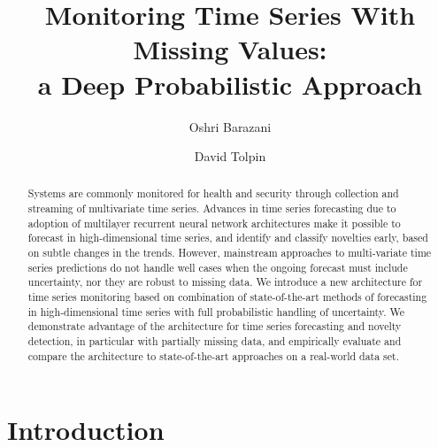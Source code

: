 \documentclass[runningheads]{llncs}
\begin{document}
\title{Monitoring Time Series With Missing Values:\\a Deep Probabilistic Approach}

\author{Oshri Barazani \and David Tolpin}


\maketitle

\begin{abstract}
Systems are commonly monitored for health and security through
collection and streaming of multivariate time series. Advances
in time series forecasting due to adoption of multilayer
recurrent neural network architectures make it possible to
forecast in high-dimensional time series, and identify and
classify novelties early, based on subtle changes in the trends.
However, mainstream approaches to multi-variate time series
predictions do not handle well cases when the ongoing forecast
must include uncertainty, nor they are robust to missing data.
We introduce a new architecture for time series monitoring based
on combination of state-of-the-art methods of forecasting in
high-dimensional time series with full probabilistic handling of
uncertainty. We demonstrate advantage of the architecture for
time series forecasting and novelty detection, in particular
with partially missing data, and empirically evaluate and
compare the architecture to state-of-the-art approaches on a
real-world data set.
\end{abstract}



\section{Introduction}
\end{document}

